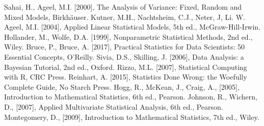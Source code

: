 \newpage{}
\begin{thebibliography}{99}
 Sahai, H., Ageel, M.I. [2000], The Analysis of Variance: Fixed, Random and Mixed Models, Birkh\"auser.
 Kutner, M.H., Nachtsheim, C.J., Neter, J, Li. W. Ageel, M.I. [2004], Applied Linear Statistical Models, 5th ed., McGraw-Hill-Irwin. 
 Hollander, M., Wolfe, D.A. [1999], Nonparametric Statistical Methods, 2nd ed., Wiley.
 Bruce, P., Bruce, A. [2017], Practical Statistics for Data Scientists: 50 Essential Concepts, O'Reilly. 
 Sivia, D.S., Skilling, J. [2006], Data Analysis: a Bayesian Tutorial, 2nd ed., Oxford. 
 Rizzo, M.L. [2007], Statistical Computing with R, CRC Press.
 Reinhart, A. [2015], Statistics Done Wrong: the Woefully Complete Guide, No Starch Press. 
 Hogg, R., McKean, J., Craig, A., [2005], Introduction to Mathematical Statistics, 6th ed., Pearson. 
 Johnson, R., Wichern, D., [2007], Applied Multivariate Statistical Analysis, 6th ed., Pearson. 
 Montegomery, D., [2009], Introduction to Mathematical Statistics, 7th ed., Wiley.
 
 
\end{thebibliography}